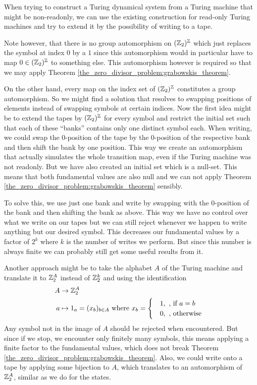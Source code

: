 \begin{Remark}
	\label{remarks:tds_construction}
	When trying to construct a Turing dynamical system from a Turing machine that might be non-readonly, we can use the existing construction for read-only Turing machines and try to extend it by the possibility of writing to a tape.

	Note however, that there is no group automorphism on $(\mathbb{Z}_2)^{\mathbb{Z}}$ which just replaces the symbol at index $0$ by a $1$ since this automorphism would in particular have to map $0 \in (\mathbb{Z}_2)^{\mathbb{Z}}$ to something else.
	This automorphism however is required so that we may apply Theorem \ref{the_zero_divisor_problem:grabowskis_theorem}.

	On the other hand, every map on the index set of $(\mathbb{Z}_2)^{\mathbb{Z}}$ constitutes a group automorphism. So we might find a solution that resolves to swapping positions of elements instead of swapping symbols at certain indices.
	Now the first idea might be to extend the tapes by $(\mathbb{Z}_2)^{\mathbb{Z}}$ for every symbol and restrict the initial set such that each of these ``banks'' contains only one distinct symbol each.
	When writing, we could swap the $0$-position of the tape by the $0$-position of the respective bank and then shift the bank by one position.
	This way we create an automorphism that actually simulates the whole transition map, even if the Turing machine was not readonly.
	But we have also created an initial set which is a null-set. This means that both fundamental values are also null and we can not apply Theorem \ref{the_zero_divisor_problem:grabowskis_theorem} sensibly.

	To solve this, we use just one bank and write by swapping with the $0$-position of the bank and then shifting the bank as above.
	This way we have no control over what we write on our tapes but we can still reject whenever we happen to write anything but our desired symbol. This decreases our fundamental values by a factor of $2^k$ where $k$ is the number of writes we perform. But since this number is always finite we can probably still get some useful results from it.

	Another approach might be to take the alphabet $A$ of the Turing machine and translate it to $\mathbb{Z}_2^A$ instead of $\mathbb{Z}_2^k$ and using the identification
	\begin{align*}
		A &\to \mathbb{Z}_2^A \\
		a &\mapsto 1_a = (x_b)_{b \in A} ~\text{where}~ x_b = \begin{cases} &1, ~\text{, if}~ a = b \\ &0, ~\text{, otherwise} \end{cases}
	\end{align*}
	Any symbol not in the image of $A$ should be rejected when encountered.
	But since if we stop, we encounter only finitely many symbols, this means applying a finite factor to the fundamental values, which does not break Theorem \ref{the_zero_divisor_problem:grabowskis_theorem}.
	Also, we could write onto a tape by applying some bijection to $A$, which translates to an automorphism of $\mathbb{Z}_2^A$, similar as we do for the states.
\end{Remark}

